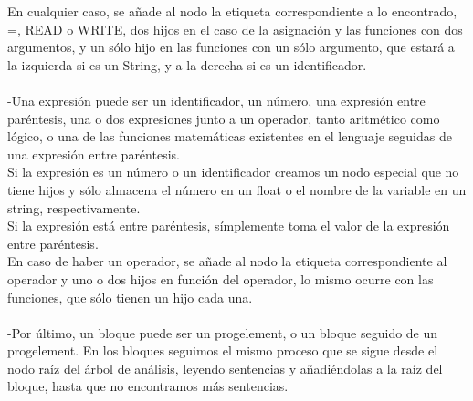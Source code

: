 \documentclass{article}
\begin{document}
En cualquier caso, se añade al nodo la etiqueta correspondiente a lo encontrado, =, READ o WRITE, dos hijos en el caso de la asignación y las funciones con dos argumentos, y un sólo hijo en las funciones con un sólo argumento, que estará a la izquierda si es un String, y a la derecha si es un identificador.\\\\
-Una expresión puede ser un identificador, un número, una expresión entre paréntesis, una o dos expresiones junto a un operador, tanto aritmético como lógico, o una de las funciones matemáticas existentes en el lenguaje seguidas de una expresión entre paréntesis.\\
Si la expresión es un número o un identificador creamos un nodo especial que no tiene hijos y sólo almacena el número en un float o el nombre de la variable en un string, respectivamente.\\
Si la expresión está entre paréntesis, símplemente toma el valor de la expresión entre paréntesis.\\
En caso de haber un operador, se añade al nodo la etiqueta correspondiente al operador y uno o dos hijos en función del operador, lo mismo ocurre con las funciones, que sólo tienen un hijo cada una.\\\\
-Por último, un bloque puede ser un progelement, o un bloque seguido de un progelement.
En los bloques seguimos el mismo proceso que se sigue desde el nodo raíz del árbol de análisis, leyendo sentencias y añadiéndolas a la raíz del bloque, hasta que no encontramos más sentencias.\\
\end{document}
